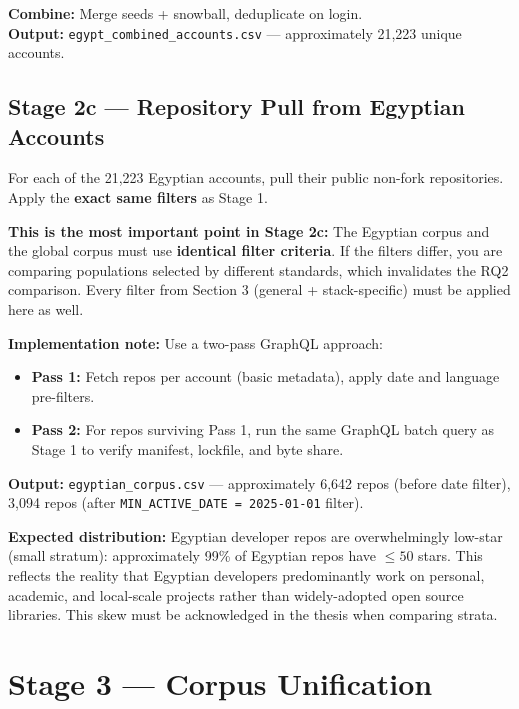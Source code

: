 \documentclass[11pt,a4paper]{article}
\begin{document}
\textbf{Combine:} Merge seeds + snowball, deduplicate on login.\\
\textbf{Output:} \texttt{egypt\_combined\_accounts.csv} — approximately 21,223 unique accounts.

\subsection{Stage 2c — Repository Pull from Egyptian Accounts}

For each of the 21,223 Egyptian accounts, pull their public non-fork repositories. Apply the \textbf{exact same filters} as Stage 1.

\begin{notebox}
\textbf{This is the most important point in Stage 2c:} The Egyptian corpus and the global corpus must use \textbf{identical filter criteria}. If the filters differ, you are comparing populations selected by different standards, which invalidates the RQ2 comparison. Every filter from Section 3 (general + stack-specific) must be applied here as well.
\end{notebox}

\textbf{Implementation note:} Use a two-pass GraphQL approach:
\begin{itemize}
    \item \textbf{Pass 1:} Fetch repos per account (basic metadata), apply date and language pre-filters.
    \item \textbf{Pass 2:} For repos surviving Pass 1, run the same GraphQL batch query as Stage 1 to verify manifest, lockfile, and byte share.
\end{itemize}

\textbf{Output:} \texttt{egyptian\_corpus.csv} — approximately 6,642 repos (before date filter), 3,094 repos (after \texttt{MIN\_ACTIVE\_DATE = 2025-01-01} filter).

\textbf{Expected distribution:} Egyptian developer repos are overwhelmingly low-star (small stratum): approximately 99\% of Egyptian repos have $\leq50$ stars. This reflects the reality that Egyptian developers predominantly work on personal, academic, and local-scale projects rather than widely-adopted open source libraries. This skew must be acknowledged in the thesis when comparing strata.

\section{Stage 3 — Corpus Unification}
\end{document}
